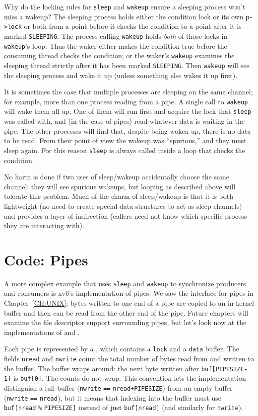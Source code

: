 Why do the locking rules for 
\lstinline{sleep}
and
\lstinline{wakeup}
ensure a sleeping process won't miss a wakeup?
The sleeping process holds either
the condition lock or its own
\lstinline{p->lock} 
or both from a point before it checks the condition
to a point after it is marked \texttt{SLEEPING}.
The process calling \texttt{wakeup} holds \textit{both}
of those locks in \texttt{wakeup}'s loop.
Thus the waker either makes the condition true before
the consuming thread checks the condition;
or the waker's \lstinline{wakeup} examines the sleeping
thread strictly after it has been marked \texttt{SLEEPING}.
Then 
\lstinline{wakeup}
will see the sleeping process and wake it up
(unless something else wakes it up first).

It is sometimes the case that multiple processes are sleeping
on the same channel; for example, more than one process
reading from a pipe.
A single call to 
\lstinline{wakeup}
will wake them all up.
One of them will run first and acquire the lock that
\lstinline{sleep}
was called with, and (in the case of pipes) read whatever
data is waiting in the pipe.
The other processes will find that, despite being woken up,
there is no data to be read.
From their point of view the wakeup was ``spurious,'' and
they must sleep again.
For this reason \lstinline{sleep} is always called inside a loop that
checks the condition.

No harm is done if two uses of sleep/wakeup accidentally
choose the same channel: they will see spurious wakeups,
but looping as described above will tolerate this problem.
Much of the charm of sleep/wakeup is that it is both
lightweight (no need to create special data
structures to act as sleep channels) and provides a layer
of indirection (callers need not know which specific process
they are interacting with).
\section{Code: Pipes}
A more complex example that uses \lstinline{sleep}
and \lstinline{wakeup} to synchronize producers and
consumers is xv6's implementation of pipes.
We saw the interface for pipes in Chapter~\ref{CH:UNIX}:
bytes written to one end of a pipe are copied
to an in-kernel buffer and then can be read from
the other end of the pipe.
Future chapters will examine the file descriptor support
surrounding pipes, but let's look now at the
implementations of 
and
.

Each pipe
is represented by a 
,
which contains
a 
\lstinline{lock}
and a 
\lstinline{data}
buffer.
The fields
\lstinline{nread}
and
\lstinline{nwrite}
count the total number of bytes read from
and written to the buffer.
The buffer wraps around:
the next byte written after
\lstinline{buf[PIPESIZE-1]}
is 
\lstinline{buf[0]}.
The counts do not wrap.
This convention lets the implementation
distinguish a full buffer 
(\lstinline{nwrite}
\lstinline{==}
\lstinline{nread+PIPESIZE})
from an empty buffer
(\lstinline{nwrite}
\lstinline{==}
\lstinline{nread}),
but it means that indexing into the buffer
must use
\lstinline{buf[nread}
\lstinline{%}
\lstinline{PIPESIZE]}
instead of just
\lstinline{buf[nread]} 
(and similarly for
\lstinline{nwrite}).

